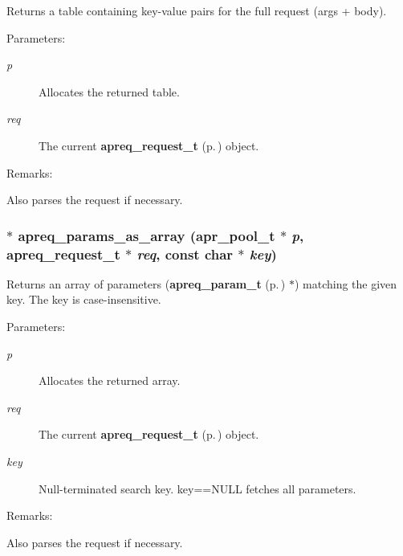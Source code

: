 Returns a table containing key-value pairs for the full request (args + body). \begin{Desc}
\item[Parameters: ]\par
\begin{description}
\item[{\em 
p}]Allocates the returned table. \item[{\em 
req}]The current {\bf apreq\_\-request\_\-t} {\rm (p.\,\pageref{structapreq__request__t})} object. \end{description}
\end{Desc}
\begin{Desc}
\item[Remarks: ]\par
Also parses the request if necessary. \end{Desc}
\subsubsection{$\ast$ apreq\_\-params\_\-as\_\-array ({\bf apr\_\-pool\_\-t} $\ast$ {\em p}, {\bf apreq\_\-request\_\-t} $\ast$ {\em req}, const char $\ast$ {\em key})}\label{group__params_a8}


Returns an array of parameters ({\bf apreq\_\-param\_\-t} {\rm (p.\,\pageref{structapreq__param__t})} $\ast$) matching the given key. The key is case-insensitive. \begin{Desc}
\item[Parameters: ]\par
\begin{description}
\item[{\em 
p}]Allocates the returned array. \item[{\em 
req}]The current {\bf apreq\_\-request\_\-t} {\rm (p.\,\pageref{structapreq__request__t})} object. \item[{\em 
key}]Null-terminated search key. key==NULL fetches all parameters. \end{description}
\end{Desc}
\begin{Desc}
\item[Remarks: ]\par
Also parses the request if necessary. \end{Desc}
